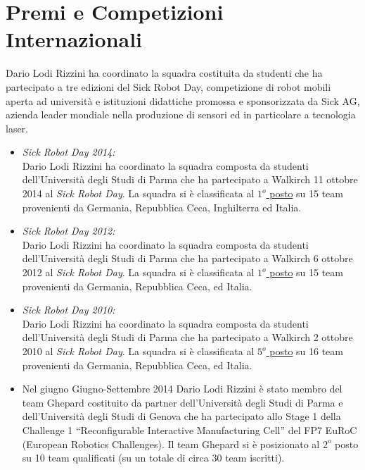 \documentclass[11pt]{article}
\newcommand{\ITEMDATE}[1]{\item \textit{#1:}\\}
\begin{document}

\section*{Premi e Competizioni Internazionali}

Dario Lodi Rizzini ha coordinato la squadra costituita da studenti che ha partecipato a tre edizioni del Sick Robot Day,
competizione di robot mobili aperta ad universit\`a e istituzioni didattiche promossa e sponsorizzata 
da Sick AG, azienda leader mondiale nella produzione di sensori ed in particolare a tecnologia laser. 

\begin{itemize}

\ITEMDATE{Sick Robot Day 2014}
Dario Lodi Rizzini ha coordinato la squadra composta da studenti dell'Universit\`a degli Studi di Parma
che ha partecipato a Walkirch 11 ottobre 2014 al \emph{Sick Robot Day}.
La squadra si \`e classificata al \underline{$1^o$ posto} su 15 team provenienti da Germania, Repubblica Ceca,
Inghilterra ed Italia. 

\ITEMDATE{Sick Robot Day 2012}
Dario Lodi Rizzini ha coordinato la squadra composta da studenti dell'Universit\`a degli Studi di Parma
che ha partecipato a Walkirch 6 ottobre 2012 al \emph{Sick Robot Day}.
La squadra si \`e classificata al \underline{$1^o$ posto} su 15 team provenienti da Germania, Repubblica Ceca,
ed Italia. 

\ITEMDATE{Sick Robot Day 2010}
Dario Lodi Rizzini ha coordinato la squadra composta da studenti dell'Universit\`a degli Studi di Parma
che ha partecipato a Walkirch 2 ottobre 2010 al \emph{Sick Robot Day}.
La squadra si \`e classificata al \underline{$5^o$ posto} su 16 team provenienti da Germania, Repubblica Ceca,
ed Italia. 

\end{itemize}

\begin{itemize}
\item Nel giugno Giugno-Settembre 2014 Dario Lodi Rizzini \`e stato membro del team Ghepard costituito da partner dell'Universit\`a degli Studi di Parma e dell'Universit\`a degli Studi di Genova che ha partecipato allo Stage 1 della Challenge 1 ``Reconfigurable Interactive Manufacturing Cell'' del FP7 EuRoC (European Robotics Challenges).
Il team Ghepard si \`e posizionato al $2^o$ posto su 10 team qualificati (su un totale di circa 30 team iscritti).
\end{itemize}
\end{document}

